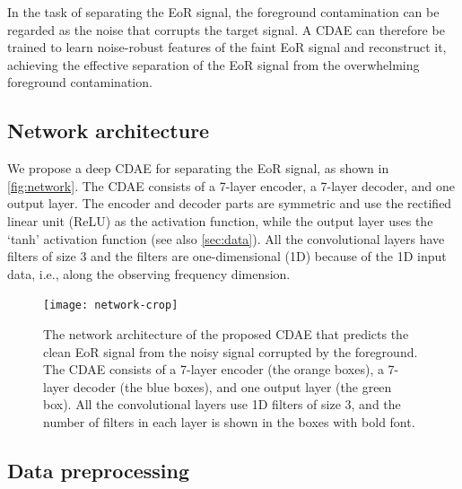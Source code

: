 \documentclass[letters,a4paper,fleqn,usenatbib]{mnras}
\begin{document}
In the task of separating the EoR signal, the foreground contamination
can be regarded as the noise that corrupts the target signal.
A CDAE can therefore be trained to learn noise-robust features of the
faint EoR signal and reconstruct it, achieving the effective separation
of the EoR signal from the overwhelming foreground contamination.


\subsection{Network architecture}
\label{sec:architecture}

We propose a deep CDAE for separating the EoR signal, as shown
in \autoref{fig:network}.
The CDAE consists of a 7-layer encoder, a 7-layer decoder,
and one output layer.
The encoder and decoder parts are symmetric and use the rectified
linear unit (ReLU) as the activation function, while the output layer
uses the `tanh' activation function (see also \autoref{sec:data}).
All the convolutional layers have filters of size 3 and the filters
are one-dimensional (1D) because of the 1D input data, i.e., along the
observing frequency dimension.

\begin{figure}
  \centering
  \texttt{[image: network-crop]}
  \caption{\label{fig:network}%
    The network architecture of the proposed CDAE that
    predicts the clean EoR signal from the noisy signal corrupted by
    the foreground.
    The CDAE consists of a 7-layer encoder (the orange boxes),
    a 7-layer decoder (the blue boxes), and one output layer
    (the green box).
    All the convolutional layers use 1D filters of size 3, and
    the number of filters in each layer is shown in the boxes
    with bold font.}
\end{figure}


\subsection{Data preprocessing}
\label{sec:data}
\end{document}

